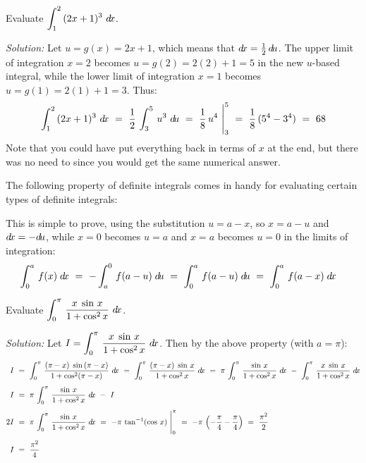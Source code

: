\begin{exmp}\label{exmp:subst11}
\noindent Evaluate $\displaystyle\int_1^2\,(2x+1)^3~d\!x$.\vspace{1mm}
\par\noindent\emph{Solution:} Let $u = g(x) = 2x+1$, which means that
$d\!x = \frac{1}{2}\,d\!u$. The upper limit of integration $x=2$
becomes $u=g(2)=2(2)+1=5$ in the new $u$-based integral, while the lower
limit of integration $x=1$ becomes $u=g(1)=2(1)+1=3$. Thus:
\[
\int_1^2\,(2x+1)^3~d\!x ~=~ \frac{1}{2}\,\int_3^5\,u^3~d\!u ~=~
\frac{1}{8}\,u^4~\Biggr|_3^{5} ~=~ \frac{1}{8}\,(5^4 - 3^4) ~=~ 68
\]
Note that you could have put everything back in terms of $x$ at the end,
but there was no need to since you would get the same numerical answer.
\end{exmp}
\divider
\newpage
The following property of definite integrals comes in handy for evaluating
certain types of definite integrals:


This is simple to prove, using the substitution $u = a - x$, so $x = a - u$ and
$d\!x = -d\!u$, while $x=0$ becomes $u=a$ and $x=a$ becomes $u=0$ in the limits of
integration:
\begin{displaymath}
 \int_0^a \,f(x)\;d\!x ~=~ -\int_a^0 \,f(a-u)\;d\!u ~=~ \int_0^a \,f(a-u)\;d\!u ~=~
 \int_0^a \,f(a-x)\;d\!x \quad\relax
\end{displaymath}

\begin{exmp}\label{exmp:subst12}
\noindent Evaluate $\displaystyle\int_0^{\pi}\,\dfrac{x\;\sin\,x}{1 + \cos^2 x}~d\!x$.\vspace{1mm}
\par\noindent\emph{Solution:} Let $I = \displaystyle\int_0^{\pi}\,\dfrac{x\;\sin\,x}{1 + \cos^2 x}~d\!x$.
Then by the above property (with $a = \pi$):
\begin{align*}
 I ~&=~ \int_0^{\pi}\,\frac{(\pi - x)\;\sin\,(\pi - x)}{1 + \cos^2 (\pi -x)}~d\!x
 ~=~ \int_0^{\pi}\,\frac{(\pi - x)\;\sin\,x}{1 + \cos^2 x}~d\!x
 ~=~ \pi\,\int_0^{\pi}\,\frac{\sin\,x}{1 + \cos^2 x}~d\!x ~-~
      \int_0^{\pi}\,\dfrac{x\;\sin\,x}{1 + \cos^2 x}~d\!x\\[4pt]
 I ~&=~ \pi\,\int_0^{\pi}\,\frac{\sin\,x}{1 + \cos^2 x}~d\!x ~-~ I\\[4pt]
 2I ~&=~ \pi\,\int_0^{\pi}\,\frac{\sin\,x}{1 + \cos^2 x}~d\!x ~=~
         -\pi\,\tan^{-1} (\cos\,x)~\Biggr|_{0}^{\pi} ~=~ -\pi\,\left(-\frac{\pi}{4} -
         \frac{\pi}{4}\right) ~=~ \frac{\pi^2}{2}\\[4pt]
 I ~&=~ \frac{\pi^2}{4}
\end{align*}
\end{exmp}
\divider
\vspace{3mm}


